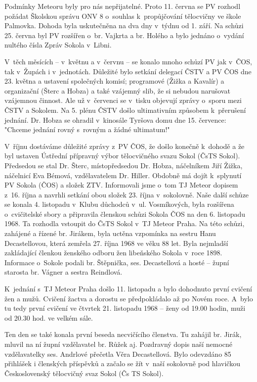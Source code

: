 \documentclass[a5paper, 11pt, twoside]{article}
\begin{document}
Podmínky Meteoru byly pro nás nepřijatelné. Proto 11. června se PV
rozhodl požádat Školskou správu ONV 8 o~souhlas k~propůjčování
tělocvičny ve škole Palmovka. Dohoda byla uskutečněna na dva dny v~týdnu
od 1. září. Na schůzi 25. června byl PV rozšířen o~br. Vajkrta a br.
Holého a bylo jednáno o~vydání nultého čísla Zpráv Sokola v~Libni.

V~těch měsících -- v~květnu a v~červnu -- se konalo mnoho schůzí PV jak
v~ČOS, tak v~Župách i v~jednotách. Důležité bylo setkání delegací ČSTV a
PV ČOS dne 23. května a ustavení společných komisí; programové (Žižka a
Kavalír) a organizační (Šterc a Hobza) a také vzájemný slib, že si
nebudou narušovat vzájemnou činnost. Ale už v~červenci se v~tisku
objevují zprávy o~sporu mezi ČSTV a Sokolem. Na 5. plénu ČSTV došlo
ultimativním způsobem k~přerušení jednání. Dr. Hobza se ohradil
v~kinosále Tyršova domu dne 15. července: "Chceme jednání rovný s~rovným a
žádné ultimatum!{}"

V~říjnu dostáváme důležité zprávy z~PV ČOS, že došlo konečně k~dohodě a
že byl ustaven Ústřední přípravný výbor tělocvičného svazu Sokol (ČsTS
Sokol). Předsedou se stal Dr. Šterc, místopředsedou Dr. Hobza,
náčelníkem Jiří Žižka, náčelnicí Eva Bémová, vzdělavatelem Dr. Hiller.
Obdobně má dojít k~splynutí PV Sokola (ČOS) a složek ZTV. Informovali
jsme o~tom TJ Meteor dopisem z~16. října a navrhli setkání obou složek
23. října v~sokolovně. Naše další schůze se konala 4. listopadu v~Klubu
důchodců v~ul. Vosmíkových, byla rozšířena o~cvičitelské sbory a
připravila členskou schůzi Sokola ČOS na den 6. listopadu 1968. Ta
rozhodla vstoupit do ČsTS Sokol v~TJ Meteor Praha. Na této schůzi,
zahájené a řízené br. Jirákem, byla uctěna vzpomínka na sestru Hanu
Decastellovou, která zemřela 27. října 1968 ve věku 88 let. Byla
nejmladší zakládající členkou ženského odboru žen libeňského Sokola
v~roce 1898. Informace o~Sokole podali br. Štěpnička, ses. Decastellová a
hosté -- župní starosta br. Vágner a sestra Reindlová.

K~jednání s~TJ Meteor Praha došlo 11. listopadu a bylo dohodnuto první
cvičení žen a mužů. Cvičení žactva a dorostu se předpokládalo až po
Novém roce. A~bylo tu tedy první cvičení ve čtvrtek 21. listopadu 1968
-- ženy od 19.00 hodin, muži od 20.30 hod. ve velkém sále.

Ten den se také konala první beseda necvičícího členstva. Tu zahájil br.
Jirák, mluvil na ní župní vzdělavatel br. Růžek aj. Pozdravný dopis naší
nemocné vzdělavatelky ses. Andrlové přečetla Věra Decastellová. Bylo
odevzdáno 85 přihlášek i členských příspěvků a začalo se žít v~naší
sokolovně pod hlavičkou Československý tělocvičný svaz Sokol (Čs TS
Sokol).
\end{document}
